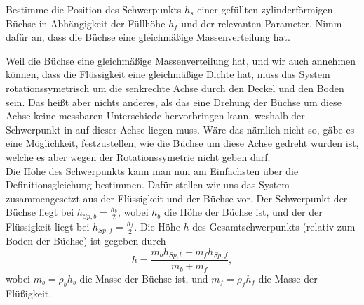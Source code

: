 \begin{minipage}[b]{0.8\textwidth}
\noindent
\begin{Exercise}[label = can, title = {Büchse}, origin = {nach 3. Runde IPhO, 2011},difficulty = 1]
	Bestimme die Position des Schwerpunkts $h_s$ einer gefüllten zylinderförmigen Büchse in Abhängigkeit der Füllhöhe $h_f$ und der relevanten Parameter. Nimm dafür an, dass die Büchse eine gleichmäßige Massenverteilung hat. 
\end{Exercise}
\end{minipage}
\begin{minipage}[b]{0.2\textwidth}
\centering
{}
\end{minipage}
\begin{Answer}[ref = can]
	Weil die Büchse eine gleichmäßige Massenverteilung hat, und wir auch annehmen können, dass die Flüssigkeit eine gleichmäßige Dichte hat, muss das System rotationssymetrisch um die senkrechte Achse durch den Deckel und den Boden sein. Das heißt aber nichts anderes, als das eine Drehung der Büchse um diese Achse keine messbaren Unterschiede hervorbringen kann, weshalb der Schwerpunkt in auf dieser Achse liegen muss. Wäre das nämlich nicht so, gäbe es eine Möglichkeit, festzustellen, wie die Büchse um diese Achse gedreht wurden ist, welche es aber wegen der Rotationssymetrie nicht geben darf.\\
	Die Höhe des Schwerpunkts kann man nun am Einfachsten über die Definitionsgleichung bestimmen. Dafür stellen wir uns das System zusammengesetzt aus der Flüssigkeit und der Büchse vor. Der Schwerpunkt der Büchse liegt bei $h_{Sp,b} = \frac{h_b}{2}$, wobei $h_b$ die Höhe der Büchse ist, und der der Flüssigkeit liegt bei $h_{Sp,f}=\frac{h_f}{2}$. Die Höhe $h$ des Gesamtschwerpunkts (relativ zum Boden der Büchse) ist gegeben durch
	\begin{equation}\label{can:spdef}
		h = \frac{m_{b}h_{Sp,b}+m_{f}h_{Sp,f}}{m_{b}+m_{f}},
	\end{equation}
	wobei $m_b = \rho_b h_b$ die Masse der Büchse ist, und $m_f = \rho_f h_f$ die Masse der Flüßigkeit.
\end{Answer}
